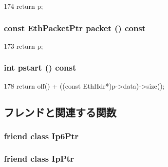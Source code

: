 \begin{DoxyCode}
174 { return p; }
\end{DoxyCode}
\hypertarget{classNet_1_1EthPtr_a13e32a6fa7b2f1b41d1d8dc32d8fda9e}{
\subsubsection[{packet}]{\setlength{\rightskip}{0pt plus 5cm}const {\bf EthPacketPtr} packet () const}}
\label{classNet_1_1EthPtr_a13e32a6fa7b2f1b41d1d8dc32d8fda9e}



\begin{DoxyCode}
173 { return p; }
\end{DoxyCode}
\hypertarget{classNet_1_1EthPtr_ae6fc8073bc02ff3fd03030e0936d56eb}{
\subsubsection[{pstart}]{\setlength{\rightskip}{0pt plus 5cm}int pstart () const}}
\label{classNet_1_1EthPtr_ae6fc8073bc02ff3fd03030e0936d56eb}



\begin{DoxyCode}
178 { return off() + ((const EthHdr*)p->data)->size(); }
\end{DoxyCode}


\subsection{フレンドと関連する関数}
\hypertarget{classNet_1_1EthPtr_a9438284c41fe8111a2ca980de73308b2}{
\subsubsection[{Ip6Ptr}]{\setlength{\rightskip}{0pt plus 5cm}friend class {\bf Ip6Ptr}}}
\label{classNet_1_1EthPtr_a9438284c41fe8111a2ca980de73308b2}
\hypertarget{classNet_1_1EthPtr_a443900f39d853561c56d3bda41a2a423}{
\subsubsection[{IpPtr}]{\setlength{\rightskip}{0pt plus 5cm}friend class {\bf IpPtr}}}
\label{classNet_1_1EthPtr_a443900f39d853561c56d3bda41a2a423}


